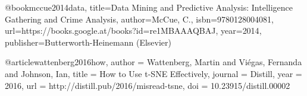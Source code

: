 @book{mccue2014data,
  title={Data Mining and Predictive Analysis: Intelligence Gathering and Crime Analysis},
  author={McCue, C.},
  isbn={9780128004081},
  url={https://books.google.at/books?id=re1MBAAAQBAJ},
  year={2014},
  publisher={Butterworth-Heinemann (Elsevier)}
}







  
@article{wattenberg2016how,
  author = {Wattenberg, Martin and Viégas, Fernanda and Johnson, Ian},
  title = {How to Use t-SNE Effectively},
  journal = {Distill},
  year = {2016},
  url = {http://distill.pub/2016/misread-tsne},
  doi = {10.23915/distill.00002}
}

